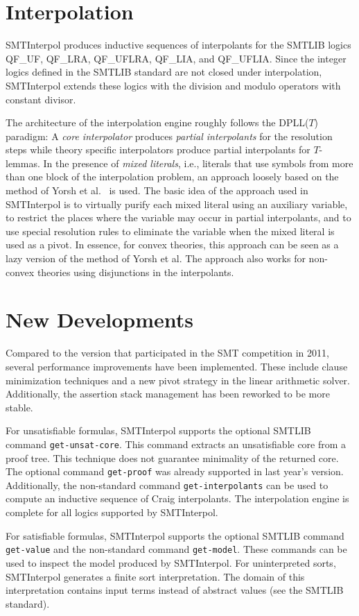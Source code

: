 \documentclass[11pt,a4paper]{easychair}
\newcommand\si{SMTInterpol\xspace}
\newcommand\T{$\mathit{T}$\xspace}
\begin{document}
\section*{Interpolation}

\si produces inductive sequences of interpolants for the SMTLIB logics QF\_UF,
QF\_LRA, QF\_UFLRA, QF\_LIA, and QF\_UFLIA.  Since the integer logics defined
in the SMTLIB standard are not closed under interpolation, \si extends these
logics with the division and modulo operators with constant divisor.

The architecture of the interpolation engine roughly follows the DPLL(\T)
paradigm: A \emph{core interpolator} produces \emph{partial interpolants} for
the resolution steps while theory specific interpolators produce partial
interpolants for \T-lemmas.  In the presence of \emph{mixed literals}, i.e.,
literals that use symbols from more than one block of the interpolation
problem,  an approach loosely based on the method of Yorsh et
al.~\cite{DBLP:conf/cade/YorshM05} is used.  The basic idea of the approach used in \si
is to virtually purify each mixed literal using an auxiliary variable, to
restrict the places where the variable may occur in partial interpolants, and
to use special resolution rules to eliminate the variable when the mixed
literal is used as a pivot.  In essence, for convex theories, this approach
can be seen as a lazy version of the method of Yorsh et al.  The approach also
works for non-convex theories using disjunctions in the interpolants.  

\section*{New Developments}
Compared to the version that participated in the SMT competition in 2011,
several performance improvements have been implemented.  These include clause
minimization techniques and a new pivot strategy in the linear arithmetic
solver.  Additionally, the assertion stack management has been reworked to be
more stable.

For unsatisfiable formulas, \si supports the optional SMTLIB command
\verb+get-unsat-core+.  This command extracts an unsatisfiable core from a
proof tree.  This technique does not guarantee minimality of the returned
core.  The optional command \verb+get-proof+ was already supported in last
year's version.  Additionally, the non-standard command
\verb+get-interpolants+ can be used to compute an inductive sequence of
Craig interpolants.  The interpolation engine is complete for all logics
supported by \si.

For satisfiable formulas, \si supports the optional SMTLIB command
\verb+get-value+ and the non-standard command \verb+get-model+.  These
commands can be used to inspect the model produced by \si.  For uninterpreted
sorts, \si generates a finite sort interpretation.  The domain of this
interpretation contains input terms instead of abstract values (see the SMTLIB
standard).



\end{document}
